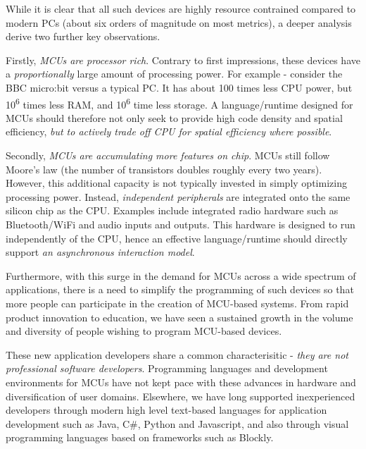 While it is clear that all such devices are highly resource contrained compared to modern PCs
(about six orders of magnitude on most metrics), a deeper analysis derive two further key observations.

Firstly, \emph{MCUs are processor rich}. Contrary to first impressions, these devices have
a \emph{proportionally} large amount of processing power. For example - consider the BBC micro:bit
versus a typical PC. It has about 100 times less CPU power, but 10\textsuperscript{6} times less RAM,
and 10\textsuperscript{6} time less storage. A language/runtime designed for MCUs should therefore not
only seek to provide high code density and spatial efficiency,
\emph{but to actively trade off CPU for spatial efficiency where possible}.

Secondly, \emph{MCUs are accumulating more features on chip}.
MCUs still follow Moore's law (the number of transistors doubles roughly every two years).
However, this additional capacity is
not typically invested in simply optimizing processing power. Instead, \emph{independent peripherals}
are integrated onto the same silicon chip as the CPU. Examples include integrated radio hardware such
as Bluetooth/WiFi and audio inputs and outputs. This hardware is designed to run independently of the
CPU, hence an effective language/runtime should directly support \emph{an asynchronous
interaction model}.

Furthermore, with this surge in the demand for MCUs across a wide spectrum of applications,
there is a need to simplify the programming of such devices so that more people can participate in
the creation of MCU-based systems. From rapid product innovation to education,
we have seen a sustained growth in the volume and diversity of people wishing to program MCU-based devices.

These new application developers share a common characterisitic - \emph{they are not professional software developers}.
Programming languages and development environments for MCUs have not kept pace with these advances
in hardware and diversification of user domains. Elsewhere, we have long supported inexperienced developers through
modern high level text-based languages for application development such as Java, C\#, Python and Javascript, and also
through visual programming languages based on frameworks such as Blockly.

